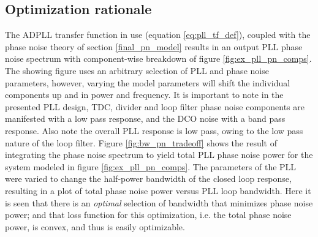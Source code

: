 \subsection{Optimization rationale}
The ADPLL transfer function in use (equation \ref{eq:pll_tf_def}), coupled with the phase noise theory of section \ref{final_pn_model} results in an output PLL phase noise spectrum with component-wise breakdown of figure \ref{fig:ex_pll_pn_comps}. The showing figure uses an arbitrary selection of PLL and phase noise parameters, however, varying the model parameters will shift the individual components up and in power and frequency. It is important to note in the presented PLL design, TDC, divider and loop filter phase noise components are manifested with a low pass response, and the DCO noise with a band pass response. Also note the overall PLL response is low pass, owing to the low pass nature of the loop filter. Figure \ref{fig:bw_pn_tradeoff} shows the result of integrating the phase noise spectrum to yield total PLL phase noise power for the system modeled in figure \ref{fig:ex_pll_pn_comps}. The parameters of the PLL were varied to change the half-power bandwidth of the closed loop response, resulting in a plot of total phase noise power versus PLL loop bandwidth. Here it is seen that there is an \textit{optimal} selection of bandwidth that minimizes phase noise power; and that loss function for this optimization, i.e. the total phase noise power, is convex, and thus is easily optimizable. 
